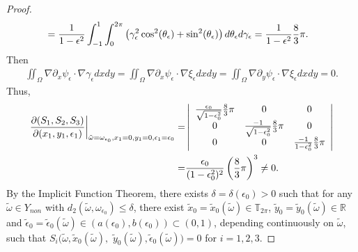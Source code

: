 \documentclass[1 [leqno, 11pt]{amsart}
\numberwithin{equation}{section}
\let\ep=\epsilon
\begin{document}
\begin{CJK*}{GBK}{song}
\begin{proof}
\begin{align*}
&={1\over 1-\ep^2}\int_{-1}^1\int_{0}^{2\pi}\left(\gamma_\ep^2\cos^2(\theta_\ep)+\sin^2(\theta_\ep)\right) d\theta_\ep d\gamma_\ep={1\over 1-\ep^2}{8\over3}\pi.
\end{align*}
Then
\begin{align*}
\iint_\Omega\nabla\partial_x\psi_{\ep}\cdot\nabla\gamma_{\ep}dxdy=
 \iint_\Omega\nabla\partial_x\psi_{\ep}\cdot\nabla\xi_{\ep}dxdy=\iint_\Omega\nabla\partial_y\psi_{\ep}\cdot\nabla\xi_{\ep}dxdy =0.
 \end{align*}
Thus,
\begin{align*}
{\partial(S_1,S_2,S_3)\over \partial(x_1,y_1,\ep_1)}\bigg|_{\tilde \omega=\omega_{\ep_0},x_1=0,y_1=0,\ep_1=\ep_0}
=&\left| \begin{array}{cccc} {\ep_0\over \sqrt{1-\ep_0^2}}{8\over3}\pi &0
&0\\ 0& {-1\over \sqrt{1-\ep_0^2}}{8\over3}\pi &
0\\
0&0  &{-1\over 1-\ep_0^2}{8\over3}\pi
\end{array} \right|\\
=&{\ep_0\over (1-\ep_0^2)^2}\left({8\over3}\pi\right)^3\neq0.
\end{align*}
By the Implicit Function Theorem, there exists $\delta=\delta(\ep_0)>0$ such that
for any
$\tilde \omega\in Y_{non}$ with $d_2(\tilde \omega,\omega_{\ep_0})\leq \delta$, there exist $\tilde x_0=\tilde x_0(\tilde\omega)\in\mathbb{T}_{2\pi}$, $\tilde y_0=\tilde y_0(\tilde\omega)\in\mathbb{R}$ and $\tilde \ep_0=\tilde \epsilon_0(\tilde\omega)\in(a(\ep_0),b(\ep_0))\subset(0,1)$, depending continuously on $\tilde \omega$, such that
 $S_i(\tilde\omega,\tilde x_0(\tilde\omega),$ $\tilde y_0(\tilde\omega),\tilde \ep_0(\tilde\omega))=0$ for $i=1,2,3$.


\end{proof}
\end{CJK*}
\end{document}

